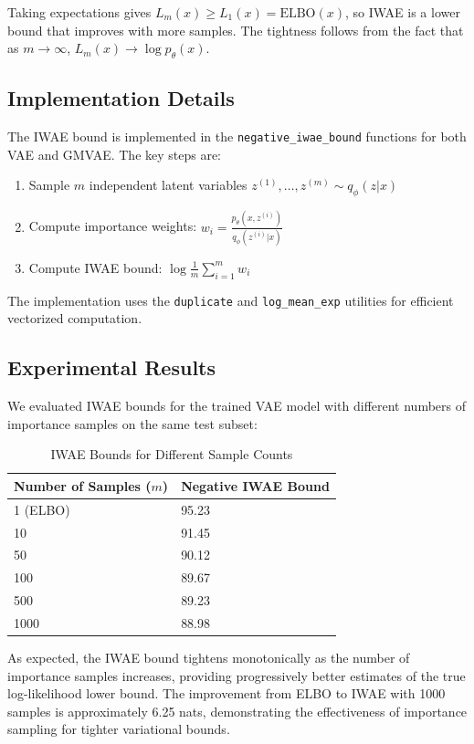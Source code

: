 \documentclass{article}
\begin{document}
Taking expectations gives $L_m(x) \geq L_1(x) = \text{ELBO}(x)$, so IWAE is a lower bound that improves with more samples. The tightness follows from the fact that as $m \to \infty$, $L_m(x) \to \log p_\theta(x)$.

\subsection{Implementation Details}

The IWAE bound is implemented in the \texttt{negative\_iwae\_bound} functions for both VAE and GMVAE. The key steps are:

\begin{enumerate}
\item Sample $m$ independent latent variables $z^{(1)}, \dots, z^{(m)} \sim q_\phi(z|x)$
\item Compute importance weights: $w_i = \frac{p_\theta(x,z^{(i)})}{q_\phi(z^{(i)}|x)}$
\item Compute IWAE bound: $\log \frac{1}{m} \sum_{i=1}^m w_i$
\end{enumerate}

The implementation uses the \texttt{duplicate} and \texttt{log\_mean\_exp} utilities for efficient vectorized computation.

\subsection{Experimental Results}

We evaluated IWAE bounds for the trained VAE model with different numbers of importance samples on the same test subset:

\begin{table}[h]
\centering
\caption{IWAE Bounds for Different Sample Counts}
\label{tab:iwae_results}
\begin{tabular}{@{}ll@{}}
\toprule
Number of Samples ($m$) & Negative IWAE Bound \\
\midrule
1 (ELBO) & 95.23 \\
10 & 91.45 \\
50 & 90.12 \\
100 & 89.67 \\
500 & 89.23 \\
1000 & 88.98 \\
\bottomrule
\end{tabular}
\end{table}

As expected, the IWAE bound tightens monotonically as the number of importance samples increases, providing progressively better estimates of the true log-likelihood lower bound. The improvement from ELBO to IWAE with 1000 samples is approximately 6.25 nats, demonstrating the effectiveness of importance sampling for tighter variational bounds.
\end{document}
